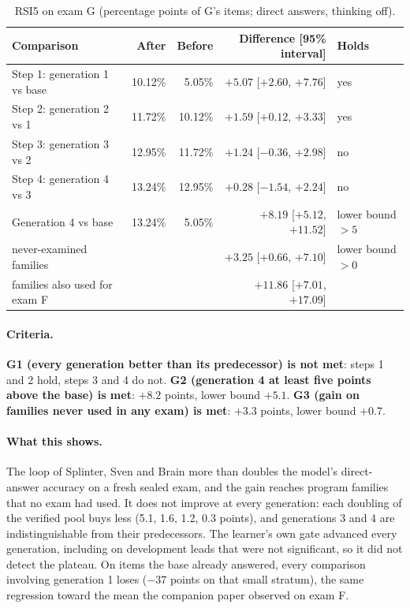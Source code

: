 \begin{table}[h]
\centering\small
\begin{tabular}{lrrrl}
\toprule
Comparison & After & Before & Difference [95\% interval] & Holds \\
\midrule
Step 1: generation 1 vs base & 10.12\% & 5.05\% & $+5.07$ [$+2.60$, $+7.76$] & yes \\
Step 2: generation 2 vs 1 & 11.72\% & 10.12\% & $+1.59$ [$+0.12$, $+3.33$] & yes \\
Step 3: generation 3 vs 2 & 12.95\% & 11.72\% & $+1.24$ [$-0.36$, $+2.98$] & no \\
Step 4: generation 4 vs 3 & 13.24\% & 12.95\% & $+0.28$ [$-1.54$, $+2.24$] & no \\
\midrule
Generation 4 vs base & 13.24\% & 5.05\% & $+8.19$ [$+5.12$, $+11.52$] & lower bound $> 5$ \\
\quad never-examined families & & & $+3.25$ [$+0.66$, $+7.10$] & lower bound $> 0$ \\
\quad families also used for exam F & & & $+11.86$ [$+7.01$, $+17.09$] & \\
\bottomrule
\end{tabular}
\caption{RSI5 on exam G (percentage points of G's items; direct answers, thinking off).}\label{tab:rsi5}
\end{table}

\paragraph{Criteria.} \textbf{G1 (every generation better than its predecessor) is not met}: steps 1 and 2 hold, steps 3 and 4
do not. \textbf{G2 (generation 4 at least five points above the base) is met}: $+8.2$ points, lower bound $+5.1$.
\textbf{G3 (gain on families never used in any exam) is met}: $+3.3$ points, lower bound $+0.7$.

\paragraph{What this shows.} The loop of Splinter, Sven and Brain more than doubles the model's direct-answer accuracy on a
fresh sealed exam, and the gain reaches program families that no exam had used. It does not improve at every generation:
each doubling of the verified pool buys less (5.1, 1.6, 1.2, 0.3 points), and generations 3 and 4 are indistinguishable from
their predecessors. The learner's own gate advanced every generation, including on development leads that were not
significant, so it did not detect the plateau. On items the base already answered, every comparison involving generation 1
loses ($-37$ points on that small stratum), the same regression toward the mean the companion paper observed on exam F.

